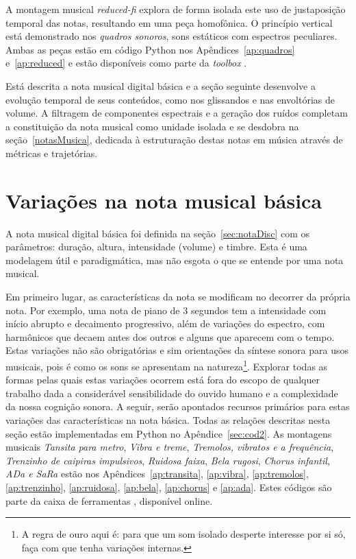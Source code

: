 A montagem musical \emph{reduced-fi} explora de forma isolada este uso de justaposição temporal das notas, resultando em uma peça homofônica. O princípio vertical está demonstrado nos \emph{quadros sonoros}, sons estáticos com espectros peculiares. Ambas as peças estão em código Python nos Apêndices~\ref{ap:quadros} e~\ref{ap:reduced} e estão disponíveis como parte da \emph{toolbox} \massa.\cite{MASSA}

Está descrita a nota musical digital básica e a seção seguinte desenvolve a evolução temporal de seus conteúdos, como nos glissandos e nas envoltórias de volume. A filtragem de componentes espectrais e a geração dos ruídos completam a constituição da nota musical como unidade isolada e se desdobra na seção~\ref{notasMusica}, dedicada à estruturação destas notas em música através de métricas e trajetórias.




\afterpage{\blankpage}
\clearpage

\section{Variações na nota musical básica}\label{varInternas}

A nota musical digital básica foi definida na seção~\ref{sec:notaDisc} com os parâmetros:
duração, altura, intensidade (volume) e timbre. Esta é uma modelagem
útil e paradigmática, mas não esgota o que se entende por
uma nota musical.

Em primeiro lugar, as características da nota se modificam no decorrer
da própria nota.\cite{Chowning} Por exemplo, uma nota de piano
de 3 segundos tem a intensidade com início abrupto e decaimento progressivo,
além de variações do espectro, com harmônicos que
decaem antes dos outros e alguns que aparecem com o tempo.
Estas variações não são obrigatórias e sim orientações da
síntese sonora para usos musicais, pois é como os sons
se apresentam na natureza\footnote{A regra de ouro
aqui é: para que um som isolado desperte interesse
por si só, faça com que tenha variações internas.\cite{Roederer}}. 
Explorar todas as formas pelas quais estas variações ocorrem está fora
do escopo de qualquer trabalho dada a considerável sensibilidade do ouvido humano
e a complexidade da nossa cognição sonora. A seguir, serão apontados
recursos primários para estas variações das características na nota
básica.
Todas as relações descritas nesta seção estão implementadas em Python no Apêndice~\ref{sec:cod2}. As montagens musicais \emph{Tansita para metro}, \emph{Vibra e treme}, \emph{Tremolos, vibratos e a frequência}, \emph{Trenzinho de caipiras impulsivos}, \emph{Ruidosa faixa}, \emph{Bela rugosi}, \emph{Chorus infantil}, \emph{ADa e SaRa} estão nos Apêndices~\ref{ap:transita}, \ref{ap:vibra}, \ref{ap:tremolos}, \ref{ap:trenzinho}, \ref{ap:ruidosa}, \ref{ap:bela}, \ref{ap:chorus} e \ref{ap:ada}. Estes códigos são parte da caixa de ferramentas \massa, disponível online.\cite{MASSA}



